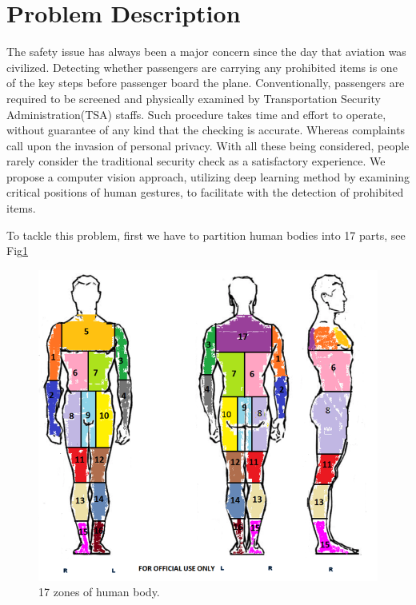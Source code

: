 \documentclass[conference,compsoc]{IEEEtran}
\begin{document}
\section{Problem Description}
	\par The safety issue has always been a major concern since the day that aviation was civilized. 
	Detecting whether passengers are carrying any prohibited items is one of the key steps before passenger board the plane. 
	Conventionally, passengers are required to be screened and physically examined by Transportation Security Administration(TSA) staffs. 
	Such procedure takes time and effort to operate, without guarantee of any kind that the checking is accurate. 
	Whereas complaints call upon the invasion of personal privacy. 
	With all these being considered, people rarely consider the traditional security check as a satisfactory experience. 
	We propose a computer vision approach, utilizing deep learning method by examining critical positions of human gestures, to facilitate with the detection of prohibited items.
	\par To tackle this problem, first we have to partition human bodies into 17 parts, see Fig\ref{bodyzones}
	\begin{figure} [ht]
		\centering
		\includegraphics[width=\linewidth]{../Pic/body_zones}
		\caption{17 zones of human body.}
		\label{bodyzones}
	\end{figure}
\end{document}
